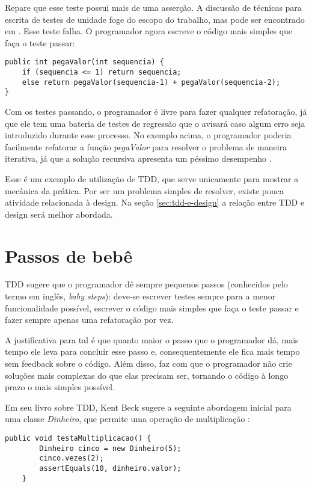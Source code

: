 Repare que esse teste possui mais de uma asserção. A discussão de técnicas para escrita de testes de unidade foge do escopo do trabalho,
mas pode ser encontrado em \cite{xunit}. Esse teste falha. O programador agora escreve o código mais simples que faça o teste passar:

\begin{lstlisting}[frame=trbl]
public int pegaValor(int sequencia) {
	if (sequencia <= 1) return sequencia;
    else return pegaValor(sequencia-1) + pegaValor(sequencia-2);
}
\end{lstlisting}

Com os testes passando, o programador é livre para fazer qualquer refatoração, já que ele tem uma bateria de testes de regressão que o
avisará caso algum erro seja introduzido durante esse processo. No exemplo acima, o programador poderia facilmente refatorar a função
\textit{pegaValor} para resolver o problema de maneira iterativa, já que a solução recursiva apresenta um péssimo desempenho \cite{clrs}.
 
Esse é um exemplo de utilização de TDD, que serve unicamente para mostrar a mecânica da prática. Por ser um problema simples de resolver,
existe pouca atividade relacionada à design. Na seção \ref{sec:tdd-e-design} a relação entre TDD e design será melhor abordada.

\section{Passos de bebê}
\label{sec:tdd-baby-steps}

TDD sugere que o programador dê sempre pequenos passos (conhecidos pelo termo em inglês, \textit{baby steps}): deve-se escrever testes 
sempre para a menor funcionalidade possível, escrever o código mais simples que faça o teste passar e fazer sempre 
apenas uma refatoração por vez. 

A justificativa para tal é que quanto maior o passo que o programador dá, mais tempo ele leva para concluir esse passo e, 
consequentemente ele fica mais tempo sem feedback sobre o código. Além disso, faz com que o programador não crie 
soluções mais complexas do que elas precisam ser, tornando o código à longo prazo o mais simples possível.

Em seu livro sobre TDD, Kent Beck sugere a seguinte abordagem inicial para uma classe \textit{Dinheiro}, que permite uma operação de 
multiplicação \cite{TDDByExample}:

\begin{lstlisting}[frame=trbl]
    public void testaMultiplicacao() {
		Dinheiro cinco = new Dinheiro(5);
		cinco.vezes(2);
		assertEquals(10, dinheiro.valor);
	}
\end{lstlisting}

